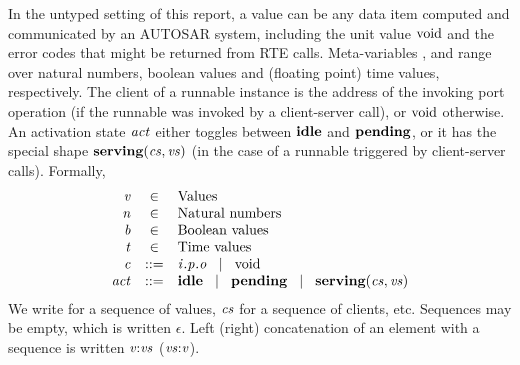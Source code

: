 \documentclass[twocolumn]{article}
\begin{document}
In the untyped setting of this report, a value  can be any data item computed and communicated by an AUTOSAR system, including the unit value $\text{void}$ and the error codes that might be returned from RTE calls. Meta-variables ,  and  range over natural numbers, boolean values and (floating point) time values, respectively. The client  of a runnable instance is the address of the invoking port operation (if the runnable was invoked by a client-server call), or $\text{void}$ otherwise. An activation state $\Act$ either toggles between $\textbf{idle}$ and $\textbf{pending}$, or it has the special shape $\Tserving{\Cs}{\Vs}$ (in the case of a runnable triggered by client-server calls). Formally,
\[
\begin{array}{rcll}
  \V{V}    & \in & \text{Values} \\
  \V{N}    & \in & \text{Natural numbers} \\
  \V{B}    & \in & \text{Boolean values} \\
  \V{T}    & \in & \text{Time values} \\
  \V{C}    & ::= & \Top{\V{O}}{\V{P}}{\V{I}} \sep \Tvoid \\
  \Act & ::= & \Tidle \sep \Tpending \sep \Tserving{\Cs}{\Vs} \\
\end{array}
\]
We write \Vs for a sequence of values, $\Cs$ for a sequence of clients, etc. Sequences may be empty, which is written $\epsilon$. Left (right) concatenation of an element with a sequence is written $\Tcons{\V{V}}{\V{Vs}}$ ($\Tsnoc{\V{Vs}}{\V{V}}$).
\end{document}
